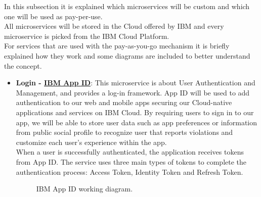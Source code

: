 In this subsection it is explained which microservices will be custom and which one will be used as pay-per-use. 
\\All microservices will be stored in the Cloud offered by IBM and every microservice is picked from the IBM Cloud Platform.
\\For services that are used with the pay-as-you-go mechanism it is briefly explained how they work and some diagrams are included to better understand the concept.
\begin{itemize}
	\item \textbf{Login - \href{https://cloud.ibm.com/catalog/services/app-id}{IBM App ID}}: \hypertarget{appidsafestreets}{This microservice} is about User Authentication and Management, and provides a log-in framework. App ID will be used to add authentication to our web and mobile apps securing our Cloud-native applications and services on IBM Cloud. By requiring users to sign in to our app, we will be able to store user data such as app preferences or information from public social profile to recognize user that reports violations and customize each user's experience within the app.
	\\When a user is successfully authenticated, the application receives tokens from App ID. The service uses three main types of tokens to complete the authentication process: Access Token, Identity Token and Refresh Token.
	\begin{figure}[h!]
		\caption{IBM App ID working diagram.}
	\end{figure}
	\FloatBarrier


\end{itemize}
